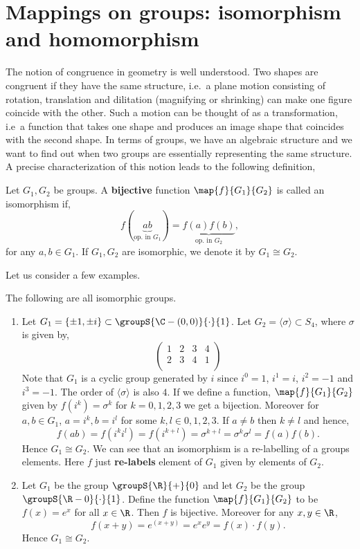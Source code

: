 \section{Mappings on groups: isomorphism and homomorphism} 
The notion of congruence in geometry is well understood. Two shapes are congruent if they have the same
structure, i.e.~a plane motion consisting of rotation, translation and dilitation (magnifying or shrinking) 
can make one figure coincide with the other. Such a motion can be thought of as a transformation, i.e~a
function that takes one shape and produces an image shape that coincides with the second shape. 
In terms of groups, we have an algebraic structure and we want to find out when two groups are essentially
representing the same structure. A precise characterization of this notion leads to the following definition,
\begin{Definition}[name=Isomorphism]
    Let $G_1,G_2$ be groups. A \textbf{bijective} function \break{}$\map{f}{G_1}{G_2}$ is called an isomorphism if,
    \[f(\underbrace{ab}_{\text{op.~in $G_1$}}) = \underbrace{f(a)f(b)}_{\text{op.~in $G_2$}},\]
    for any $a,b \in G_1$. If $G_1,G_2$ are isomorphic, we denote it by $G_1 \cong G_2$.
\end{Definition}
Let us consider a few examples.
\begin{Example}
    The following are all isomorphic groups.
    \begin{enumerate}
	\item
	    Let $G_1 = \lbrace \pm 1, \pm i \rbrace \subset \groupS{\C-(0,0)}{\cdot}{1}$. Let $G_2 = \langle
	    \sigma \rangle \subset S_4$, where $\sigma$ is given by,
	    \begin{equation*}
		\begin{pmatrix}
		    1 & 2 & 3 & 4 \\
		    2 & 3 & 4 & 1 \\
		\end{pmatrix}
	    \end{equation*}
	    Note that $G_1$ is a cyclic group generated by $i$ since $i^0 = 1$, $i^1 = i$, $i^2 = -1$ and $i^3
	    = -1$. The order of $\langle \sigma \rangle$ is also $4$. If we define a function,
	    $\map{f}{G_1}{G_2}$ given by $f(i^k) = \sigma^{k}$ for $k = 0,1,2,3$ we get a bijection.
	    Moreover for $a,b \in G_1$, $a = i^k, b = i^l$ for some $k,l \in 0,1,2,3$. If $a\neq b$ then
	    $k\neq l$ and hence,
	    \[f(ab) = f(i^k i^l) = f(i^{k+l}) = \sigma^{k+l} = \sigma^{k}\sigma^{l} = f(a)f(b).\]
	    Hence $G_1\cong G_2$. We can see that an isomorphism is a re-labelling of a groups elements. Here
	    $f$ just \textbf{re-labels} element of $G_1$ given by elements of $G_2$.
	\item
	    Let $G_1$ be the group $\groupS{\R}{+}{0}$ and let $G_2$ be the group $\groupS{\R-{0}}{\cdot}{1}$.
	    Define the function $\map{f}{G_1}{G_2}$ to be $f(x) = e^x$ for all $x \in \R$. Then $f$ is
	    bijective. Moreover for any $x,y \in \R$,
	    \[f(x + y) = e^{(x+y)} =e^{x}e^{y} = f(x) \cdot f(y). \]
	    Hence $G_1 \cong G_2$.
    \end{enumerate}
\end{Example}
